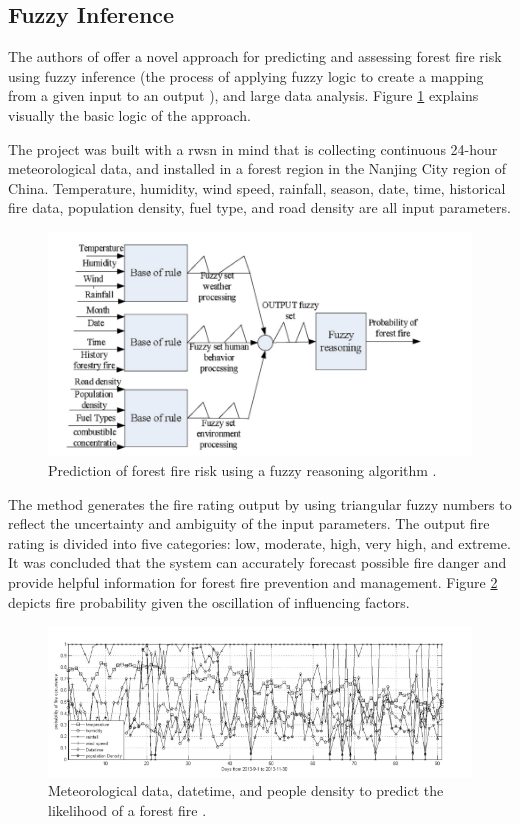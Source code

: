 \subsection{Fuzzy Inference}
The authors of \cite{LIN2018101} offer a novel approach for predicting and assessing forest fire risk using fuzzy inference (the process of applying fuzzy logic to create a mapping from a given input to an output \cite{KALOGIROU2009553}), and large data analysis. Figure \ref{fig:fuzzy_risk_prediction} explains visually the basic logic of the approach.


The project was built with a \gls{rwsn} in mind that is collecting continuous 24-hour meteorological data, and installed in a forest region in the Nanjing City region of China. Temperature, humidity, wind speed, rainfall, season, date, time, historical fire data, population density, fuel type, and road density are all input parameters.

\begin{figure}[h!]
 \centering
  \includegraphics[width=0.7\linewidth]{frontmatter/imgs/fuzzy_prediction_model.PNG}
  \caption{Prediction of forest fire risk using a fuzzy reasoning algorithm \cite{LIN2018101}.}
  \label{fig:fuzzy_risk_prediction}
\end{figure}


The method generates the fire rating output by using triangular fuzzy numbers to reflect the uncertainty and ambiguity of the input parameters. The output fire rating is divided into five categories: low, moderate, high, very high, and extreme.
It was concluded that the system can accurately forecast possible fire danger and provide helpful information for forest fire prevention and management. Figure \ref{fig:prediction_graph_fuzzy} depicts fire probability given the oscillation of influencing factors. 

\begin{figure}[h!]
 \centering
  \includegraphics[width=1\linewidth]{frontmatter/imgs/p_ocurrencia_incendio.PNG}
  \caption{Meteorological data, datetime, and people density to predict the likelihood of a forest fire \cite{LIN2018101}.}
  \label{fig:prediction_graph_fuzzy}
\end{figure}



